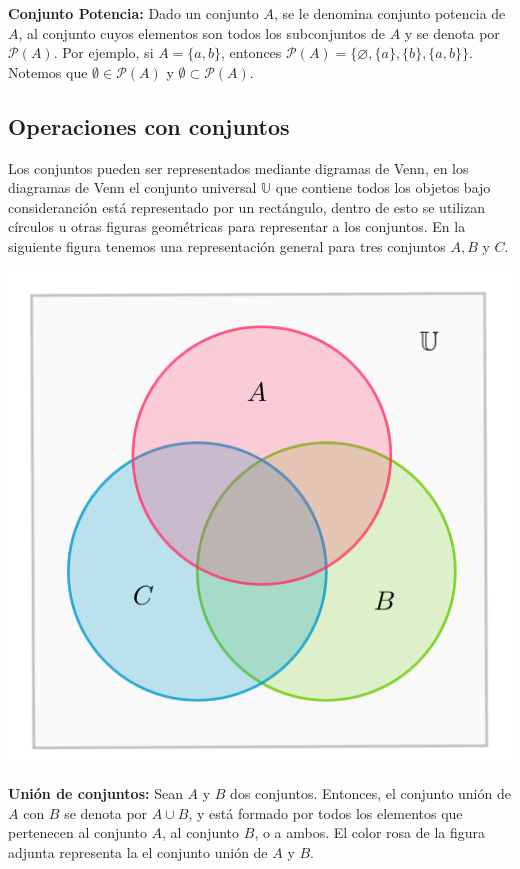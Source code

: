\textbf{Conjunto Potencia:} Dado un conjunto $A$, se le denomina conjunto potencia de $A$, al conjunto cuyos elementos son todos los subconjuntos de $A$ y se denota por $\mathcal{P}(A)$. Por ejemplo, si $A=\{a,b\}$, entonces $\mathcal{P}(A)=\{\varnothing,\{a\},\{b\},\{a,b\}\}$. Notemos que $\emptyset \in \mathcal{P}(A)$ y $\emptyset \subset \mathcal{P}(A)$.

\subsection{Operaciones con conjuntos}

Los conjuntos pueden ser representados mediante digramas de Venn, en los diagramas de Venn el conjunto universal $\mathbb{U}$ que contiene todos los objetos bajo consideranción está representado por un rectángulo, dentro de esto se utilizan círculos u otras figuras geométricas para representar a los conjuntos. En la siguiente figura tenemos una representación general para tres conjuntos $A, B$ y $C$.

\begin{center}
    \includegraphics[scale=0.7]{Imagenes/IMG1/S1-1-01.png}
\end{center}

\textbf{Unión de conjuntos:} Sean $A$ y $B$ dos conjuntos. Entonces, el conjunto unión de $A$ con $B$ se denota por $A \cup B$, y está formado por todos los elementos que pertenecen al conjunto $A$, al conjunto $B$, o a ambos. El color rosa de la figura adjunta representa la el conjunto unión de $A$ y $B$.

